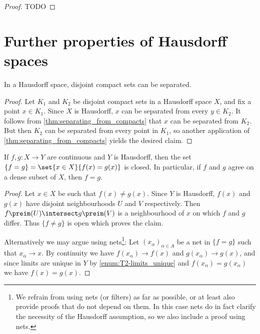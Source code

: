 \documentclass[article, a4paper, 11pt, oneside]{memoir}
\numberwithin{equation}{chapter}
\begin{document}
\begin{proof}
    TODO
\end{proof}


\section{Further properties of Hausdorff spaces}

\begin{proposition}
    \label{thm:Hausdorff-separate-compacts}
    In a Hausdorff space, disjoint compact sets can be separated.
\end{proposition}

\begin{proof}
    Let $K_1$ and $K_2$ be disjoint compact sets in a Hausdorff space $X$, and fix a point $x \in K_1$. Since $X$ is Hausdorff, $x$ can be separated from every $y \in K_2$. It follows from \cref{thm:separating_from_compacts} that $x$ can be separated from $K_2$. But then $K_2$ can be separated from every point in $K_1$, so another application of \cref{thm:separating_from_compacts} yields the desired claim.
\end{proof}


\begin{proposition}
    If $f,g \colon X \to Y$ are continuous and $Y$ is Hausdorff, then the set $\{f = g\} = \set{x \in X}{f(x) = g(x)}$ is closed. In particular, if $f$ and $g$ agree on a dense subset of $X$, then $f = g$.
\end{proposition}

\begin{proof}
    Let $x \in X$ be such that $f(x) \neq g(x)$. Since $Y$ is Hausdorff, $f(x)$ and $g(x)$ have disjoint neighbourhoods $U$ and $V$ respectively. Then $f\preim(U) \intersect g\preim(V)$ is a neighbourhood of $x$ on which $f$ and $g$ differ. Thus $\{f \neq g\}$ is open which proves the claim.

    Alternatively we may argue using nets\footnote{We refrain from using nets (or filters) as far as possible, or at least also provide proofs that do not depend on them. In this case nets do in fact clarify the necessity of the Hausdorff assumption, so we also include a proof using nets.}: Let $(x_\alpha)_{\alpha \in A}$ be a net in $\{f = g\}$ such that $x_\alpha \to x$. By continuity we have $f(x_\alpha) \to f(x)$ and $g(x_\alpha) \to g(x)$, and since limits are unique in $Y$ by \cref{enum:T2-limits_unique} and $f(x_\alpha) = g(x_\alpha)$ we have $f(x) = g(x)$.
\end{proof}
\end{document}
